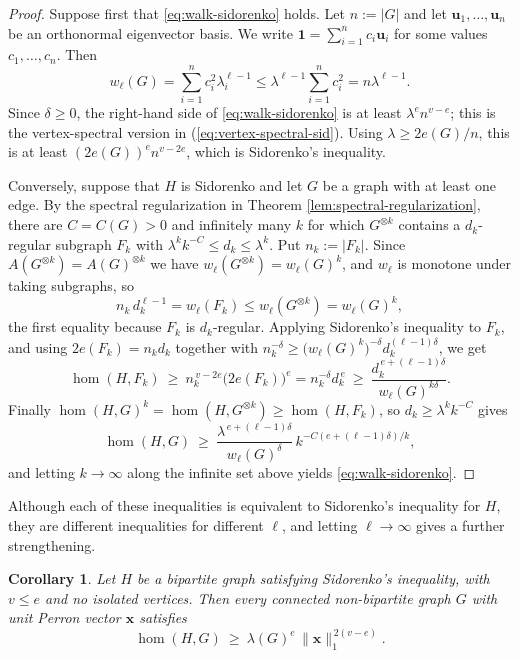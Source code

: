 \documentclass[11pt, a4paper]{article}
\newtheorem{corollary}[theorem]{Corollary}
\theoremstyle{definition}
\theoremstyle{plain}
\renewcommand{\le}{\leqslant}
\renewcommand{\ge}{\geqslant}
\begin{document}
\begin{proof}
Suppose first that \eqref{eq:walk-sidorenko}
holds. Let $n:=|G|$ and let $\bm{u}_1, \ldots ,\bm{u}_n$ be an orthonormal eigenvector basis. 
We write $\bm{1}=\sum_{i=1}^{n} c_i\bm{u}_i$ for some values $c_1, \ldots ,c_n$. Then 
$$w_\ell (G)=\sum_{i=1}^n c_i^2\lambda_i^{\ell -1}
 \le \lambda^{\ell -1}\sum_{i=1}^n  c_i^{2}
 = n \lambda^{\ell -1}.$$
  Since $\delta \ge 0$, the
right-hand side of \eqref{eq:walk-sidorenko} is at least $\lambda^{e} n^{v-e}$; 
this is the vertex-spectral version in (\ref{eq:vertex-spectral-sid}). 
Using $\lambda \ge 2e(G)/ n$, this is at least
$(2e(G))^{e} n^{v-2e}$, which is Sidorenko's
inequality.  

Conversely, suppose that $H$ is Sidorenko and let
$G$ be a graph with at least one edge. 
By the spectral regularization in Theorem \ref{lem:spectral-regularization}, 
there are $C=C(G)>0$ and
infinitely many $k$ for which $G^{\otimes k}$
contains a $d_k$-regular subgraph $F_k$ with
$\lambda^{k}k^{-C}\le d_k\le \lambda^{k}$. Put
$n_k:=|F_k|$. Since $A(G^{\otimes k})
 =A(G)^{\otimes k}$ we have
$w_\ell (G^{\otimes k})=w_\ell (G)^{k}$, and
$w_\ell$ is monotone under taking subgraphs, so
\[
  n_k\,d_k^{\ell -1}=w_\ell (F_k)
  \le w_\ell (G^{\otimes k})=w_\ell (G)^{k},
\]
the first equality because $F_k$ is $d_k$-regular.
Applying Sidorenko's inequality to $F_k$, and
using $2e(F_k)=n_kd_k$ together with
$n_k^{-\delta}\ge
 \bigl(w_\ell (G)^{k}\bigr)^{-\delta}
 d_k^{(\ell -1)\delta}$,  we get
\[
  \hom (H,F_k)\ \ge\ n_k^{\,v-2e} \big(2e(F_k) \big)^{e}
  =n_k^{-\delta}d_k^{\,e}
  \ \ge\ \frac{d_k^{\,e+(\ell -1)\delta}}
              {w_\ell (G)^{k\delta}} .
\]
Finally $\hom (H,G)^{k}
 =\hom (H,G^{\otimes k})\ge \hom (H,F_k)$, so
$d_k\ge \lambda^{k}k^{-C}$ gives
\[
  \hom (H,G)\ \ge\
  \frac{\lambda^{\,e+(\ell -1)\delta}}
       {w_\ell (G)^{\delta}}\,
  k^{-C(e+(\ell -1)\delta)/k},
\]
and letting $k\to \infty$ along the infinite set
above yields \eqref{eq:walk-sidorenko}.
\end{proof}

Although each of these inequalities is equivalent to Sidorenko's inequality for $H$, they are different inequalities for different $\ell$, and letting $\ell \to \infty$ gives a further strengthening. 



\begin{corollary}\label{cor:perron-sidorenko}
Let $H$ be a bipartite graph satisfying Sidorenko's
inequality, with $v\le e$ and no isolated vertices. 
Then every connected non-bipartite graph $G$ with unit Perron
vector $\bm{x}$ satisfies
\[
  \hom (H,G)\ \ge\ \lambda (G)^{e}\,
  \lVert \bm{x}\rVert_1^{\,2(v-e)} .
\]
\end{corollary}
\end{document}
